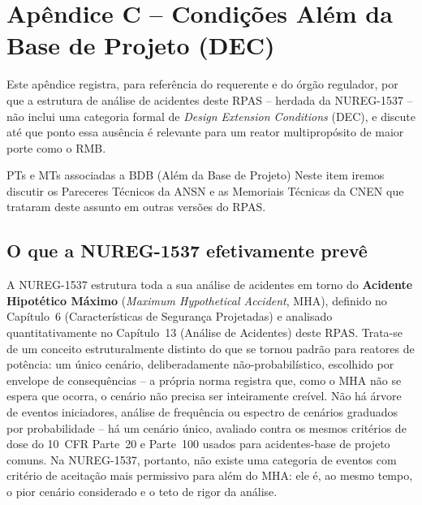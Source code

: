 \hypertarget{apC}{}%
\section*{Ap\^endice C -- Condi\c{c}\~oes Al\'em da Base de Projeto (DEC)}
\label{sec:apendice-c}

Este ap\^endice registra, para refer\^encia do requerente e do \'org\~ao
regulador, por que a estrutura de an\'alise de acidentes deste RPAS --
herdada da NUREG-1537 -- n\~ao inclui uma categoria formal de
\emph{Design Extension Conditions} (DEC), e discute at\'e que ponto essa
aus\^encia \'e relevante para um reator multiprop\'osito de maior porte
como o RMB.

\begin{observacao}{PTs e MTs associadas a BDB (Além da Base de Projeto)}
Neste item iremos discutir os Pareceres Técnicos da ANSN e as  Memoriais Técnicas da CNEN que trataram deste assunto em outras versões do RPAS.
\end{observacao}

\subsection*{O que a NUREG-1537 efetivamente prev\^e}

A NUREG-1537 estrutura toda a sua an\'alise de acidentes em torno do
\textbf{Acidente Hipot\'etico M\'aximo} (\emph{Maximum Hypothetical
Accident}, MHA), definido no Cap\'itulo~6 (Caracter\'isticas de Seguran\c{c}a
Projetadas) e analisado quantitativamente no Cap\'itulo~13 (An\'alise de
Acidentes) deste RPAS. Trata-se de um conceito estruturalmente distinto
do que se tornou padr\~ao para reatores de pot\^encia: um \'unico
cen\'ario, deliberadamente n\~ao-probabil\'istico, escolhido por envelope
de consequ\^encias -- a pr\'opria norma registra que, como o MHA n\~ao se
espera que ocorra, o cen\'ario n\~ao precisa ser inteiramente cre\'ivel.
N\~ao h\'a \'arvore de eventos iniciadores, an\'alise de frequ\^encia ou
espectro de cen\'arios graduados por probabilidade -- h\'a um cen\'ario
\'unico, avaliado contra os mesmos crit\'erios de dose do 10~CFR
Parte~20 e Parte~100 usados para acidentes-base de projeto comuns. Na
NUREG-1537, portanto, n\~ao existe uma categoria de eventos com crit\'erio
de aceita\c{c}\~ao mais permissivo para al\'em do MHA: ele \'e, ao mesmo
tempo, o pior cen\'ario considerado e o teto de rigor da an\'alise.

